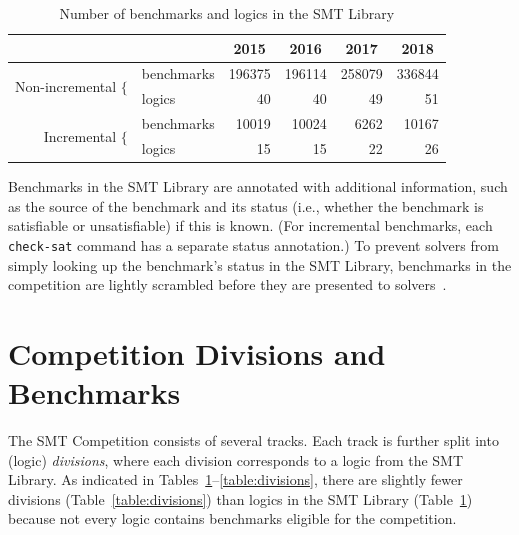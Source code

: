 \documentclass[dvipsnames,table,twoside,11pt]{article}
\begin{document}
\begin{table}
  \caption{Number of benchmarks and logics in the SMT Library}
  \label{table:smtlib}
  \centering
  \begin{tabular}{r@{\ \ }lrrrr}
    \toprule
                               & & \multicolumn{1}{c}{2015} & \multicolumn{1}{c}{2016} & \multicolumn{1}{c}{2017} & \multicolumn{1}{c}{2018} \\
    \midrule
    \multirow{2}{*}{Non-incremental $\{$} & benchmarks & 196375 & 196114 & 258079 & 336844 \\
                                          & logics     &     40 &     40 &     49 &     51 \\
    \multirow{2}{*}{Incremental $\{$}     & benchmarks &  10019 &  10024 &   6262 &  10167 \\
                                          & logics     &     15 &     15 &     22 &     26 \\
    \bottomrule
  \end{tabular}
\end{table}

Benchmarks in the SMT Library are annotated with additional
information, such as the source of the benchmark and its status (i.e.,
whether the benchmark is satisfiable or unsatisfiable) if this is
known.  (For incremental benchmarks, each {\tt check-sat} command has
a separate status annotation.)  To prevent solvers from simply looking
up the benchmark's status in the SMT Library, benchmarks in the
competition are lightly scrambled before they are presented to
solvers~\cite{DBLP:conf/cade/Weber16}.


\section{Competition Divisions and Benchmarks}
\label{sec:benchmarks}

The SMT Competition consists of several tracks.  Each track is further split
into (logic) \emph{divisions}, where each division corresponds to a logic from
the SMT Library.  As indicated in
Tables~\ref{table:smtlib}--\ref{table:divisions}, there are slightly fewer
divisions (Table~\ref{table:divisions}) than logics in the SMT Library
(Table~\ref{table:smtlib}) because not every logic contains benchmarks eligible
for the competition.
\end{document}
